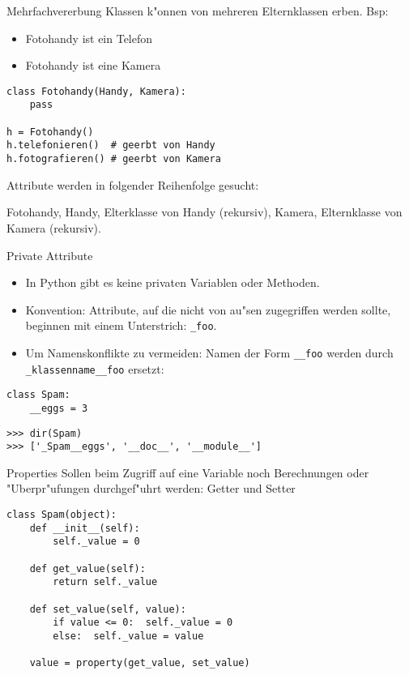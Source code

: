\begin{frame}[fragile]{Mehrfachvererbung}
Klassen k"onnen von mehreren Elternklassen erben. Bsp:
\begin{itemize}
\item Fotohandy ist ein Telefon
\item Fotohandy ist eine Kamera
\end{itemize}
\begin{lstlisting}[style=Python]
class Fotohandy(Handy, Kamera):
    pass

h = Fotohandy()
h.telefonieren()  # geerbt von Handy
h.fotografieren() # geerbt von Kamera
\end{lstlisting}
Attribute werden in folgender Reihenfolge gesucht:

Fotohandy, Handy, Elterklasse von Handy (rekursiv), Kamera, Elternklasse von Kamera (rekursiv).
\end{frame}

\begin{frame}[fragile]{Private Attribute}
\begin{itemize}
\item In Python gibt es keine privaten Variablen oder Methoden. 
\item \alert{Konvention:} Attribute, auf die nicht von au"sen zugegriffen werden sollte, beginnen mit einem Unterstrich: \lstinline{_foo}.
\item Um Namenskonflikte zu vermeiden: Namen der Form \lstinline{__foo} werden durch \lstinline{_klassenname__foo} ersetzt:
\end{itemize}
\begin{lstlisting}[style=Python]
class Spam:
    __eggs = 3
\end{lstlisting}
\begin{lstlisting}[style=Shell]
>>> dir(Spam)
>>> ['_Spam__eggs', '__doc__', '__module__']
\end{lstlisting}
\end{frame}

\begin{frame}[fragile]{Properties}
Sollen beim Zugriff auf eine Variable noch Berechnungen oder "Uberpr"ufungen durchgef"uhrt werden: \alert{Getter} und \alert{Setter}
\begin{lstlisting}[style=Python]
class Spam(object):
    def __init__(self):
        self._value = 0
    
    def get_value(self):
        return self._value

    def set_value(self, value):
        if value <= 0:  self._value = 0
        else:  self._value = value

    value = property(get_value, set_value)
\end{lstlisting}
\end{frame}

